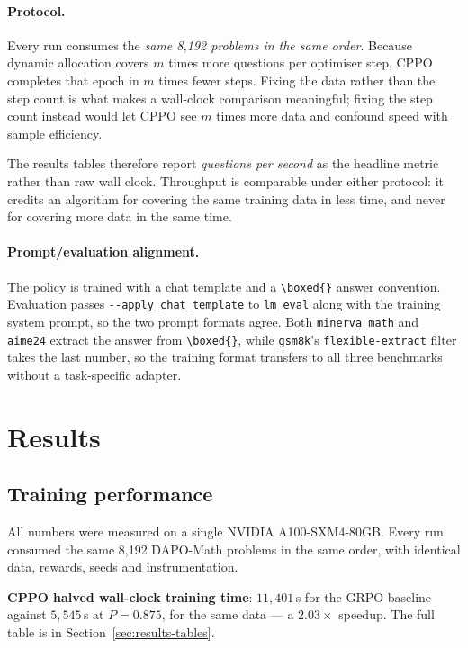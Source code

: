 \documentclass[11pt,a4paper]{article}
\begin{document}
\paragraph{Protocol.} Every run consumes the \emph{same 8{,}192 problems in
the same order}. Because dynamic allocation covers $m$ times more questions
per optimiser step, CPPO completes that epoch in $m$ times fewer steps. Fixing
the data rather than the step count is what makes a wall-clock comparison
meaningful; fixing the step count instead would let CPPO see $m$ times more
data and confound speed with sample efficiency.

The results tables therefore report \emph{questions per second} as the
headline metric rather than raw wall clock. Throughput is comparable under
either protocol: it credits an algorithm for covering the same training data
in less time, and never for covering more data in the same time.

\paragraph{Prompt/evaluation alignment.} The policy is trained with a chat
template and a \verb|\boxed{}| answer convention. Evaluation passes
\texttt{-{}-apply\_chat\_template} to \texttt{lm\_eval} along with the
training system prompt, so the two prompt formats agree. Both
\texttt{minerva\_math} and \texttt{aime24} extract the answer from
\verb|\boxed{}|, while \texttt{gsm8k}'s \texttt{flexible-extract} filter
takes the last number, so the training format transfers to all three
benchmarks without a task-specific adapter.

\section{Results}
\label{sec:results}

\subsection{Training performance}
\label{sec:results-perf}

All numbers were measured on a single NVIDIA A100-SXM4-80GB. Every run consumed
the same 8{,}192 DAPO-Math problems in the same order, with identical data,
rewards, seeds and instrumentation.

\textbf{CPPO halved wall-clock training time}: $11{,}401$\,s for the GRPO
baseline against $5{,}545$\,s at $P = 0.875$, for the same data --- a
$2.03\times$ speedup. The full table is in Section~\ref{sec:results-tables}.
\end{document}
